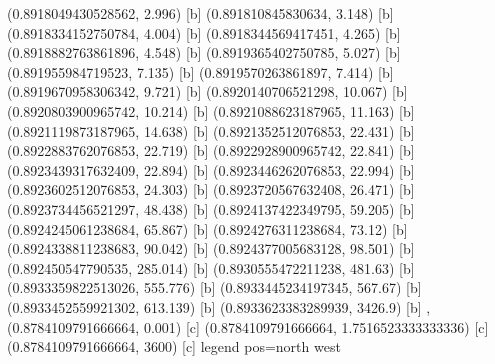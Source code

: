 {{{(0.8918049430528562, 2.996) [b] 
(0.891810845830634, 3.148) [b] 
(0.8918334152750784, 4.004) [b] 
(0.8918344569417451, 4.265) [b] 
(0.8918882763861896, 4.548) [b] 
(0.8919365402750785, 5.027) [b] 
(0.891955984719523, 7.135) [b] 
(0.8919570263861897, 7.414) [b] 
(0.8919670958306342, 9.721) [b] 
(0.8920140706521298, 10.067) [b] 
(0.8920803900965742, 10.214) [b] 
(0.8921088623187965, 11.163) [b] 
(0.8921119873187965, 14.638) [b] 
(0.8921352512076853, 22.431) [b] 
(0.8922883762076853, 22.719) [b] 
(0.8922928900965742, 22.841) [b] 
(0.8923439317632409, 22.894) [b] 
(0.8923446262076853, 22.994) [b] 
(0.8923602512076853, 24.303) [b] 
(0.8923720567632408, 26.471) [b] 
(0.8923734456521297, 48.438) [b] 
(0.8924137422349795, 59.205) [b] 
(0.8924245061238684, 65.867) [b] 
(0.8924276311238684, 73.12) [b] 
(0.8924338811238683, 90.042) [b] 
(0.8924377005683128, 98.501) [b] 
(0.892450547790535, 285.014) [b] 
(0.8930555472211238, 481.63) [b] 
(0.8933359822513026, 555.776) [b] 
(0.8933445234197345, 567.67) [b] 
(0.8933452559921302, 613.139) [b] 
(0.8933623383289939, 3426.9) [b] 
},{(0.8784109791666664, 0.001) [c] 
(0.8784109791666664, 1.7516523333333336) [c] 
(0.8784109791666664, 3600) [c] 
}}}{legend pos=north west}